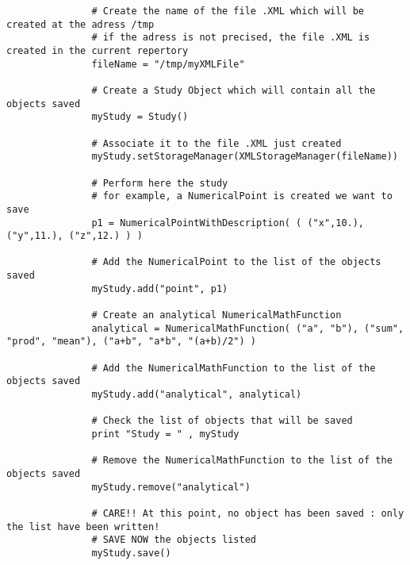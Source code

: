              \begin{lstlisting}
               # Create the name of the file .XML which will be created at the adress /tmp
               # if the adress is not precised, the file .XML is created in the current repertory
               fileName = "/tmp/myXMLFile"

               # Create a Study Object which will contain all the objects saved
               myStudy = Study()

               # Associate it to the file .XML just created
               myStudy.setStorageManager(XMLStorageManager(fileName))

               # Perform here the study
               # for example, a NumericalPoint is created we want to save
               p1 = NumericalPointWithDescription( ( ("x",10.), ("y",11.), ("z",12.) ) )

               # Add the NumericalPoint to the list of the objects saved
               myStudy.add("point", p1)

               # Create an analytical NumericalMathFunction
               analytical = NumericalMathFunction( ("a", "b"), ("sum", "prod", "mean"), ("a+b", "a*b", "(a+b)/2") )

               # Add the NumericalMathFunction to the list of the objects saved
               myStudy.add("analytical", analytical)

               # Check the list of objects that will be saved
               print "Study = " , myStudy

               # Remove the NumericalMathFunction to the list of the objects saved
               myStudy.remove("analytical")

               # CARE!! At this point, no object has been saved : only the list have been written!
               # SAVE NOW the objects listed
               myStudy.save()
             \end{lstlisting}
